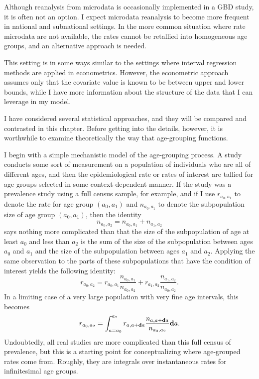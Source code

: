 Although reanalysis from microdata is occasionally implemented in a GBD study,
it is often not an option.  I expect microdata
reanalysis to become more frequent in national and subnational
settings.  In the more common situation where rate microdata are not
available, the rates cannot be retallied into homogeneous age groups,
and an alternative approach is needed.

This setting is in some ways similar to the settings where interval
regression methods are applied in
econometrics.\cite{amemiya_regression_1973,manski_inference_2002,cook_partially_2012}
However, the econometric approach assumes only that the covariate
value is known to be between upper and lower bounds, while I have more
information about the structure of the data that I can leverage in my
model.

I have considered several statistical approaches, and
they will be compared and contrasted in this chapter.  Before getting
into the details, however, it is worthwhile to examine theoretically
the way that age-grouping functions.

I begin with a simple mechanistic model of the age-grouping process.
A study conducts some sort of measurement on a population of
individuals who are all of different ages, and then the
epidemiological rate or rates of interest are tallied for age groups
selected in some context-dependent manner. If the study was a
prevalence study using a full census sample, for example, and if I use
$r_{a_0,a_1}$ to denote the rate for age group $(a_0, a_1)$ and
$n_{a_0,a_1}$ to denote the subpopulation size of age group
$(a_0,a_1)$, then the identity
\[
n_{a_0, a_2} = n_{a_0,a_1} + n_{a_1,a_2}
\]
says nothing more complicated than that the size of the subpopulation
of age at least $a_0$ and less than $a_2$ is the sum of the size of
the subpopulation between ages $a_0$ and $a_1$ and the size of the
subpopulation between ages $a_1$ and $a_2$.  Applying the same
observation to the parts of these subpopulations that have the condition
of interest yields the following identity:
\[
r_{a_0,a_2} = r_{a_0,a_1}\frac{n_{a_0,a_1}}{n_{a_0,a_2}} + r_{a_1,a_2}\frac{n_{a_1,a_2}}{n_{a_0,a_2}}.
\]
In a limiting case of a very large population with very fine age
intervals, this becomes
\[
r_{a_0,a_2} = \int_{a=a_0}^{a_2} r_{a,a+\mathbf{d} a}\frac{n_{a,a+\mathbf{d} a}}{n_{a_0,a_2}}\mathbf{d} a.
\]
Undoubtedly, all real studies are more complicated than this full
census of prevalence, but this is a starting point for conceptualizing
where age-grouped rates come from.  Roughly, they are integrals over
instantaneous rates for infinitesimal age groups.

